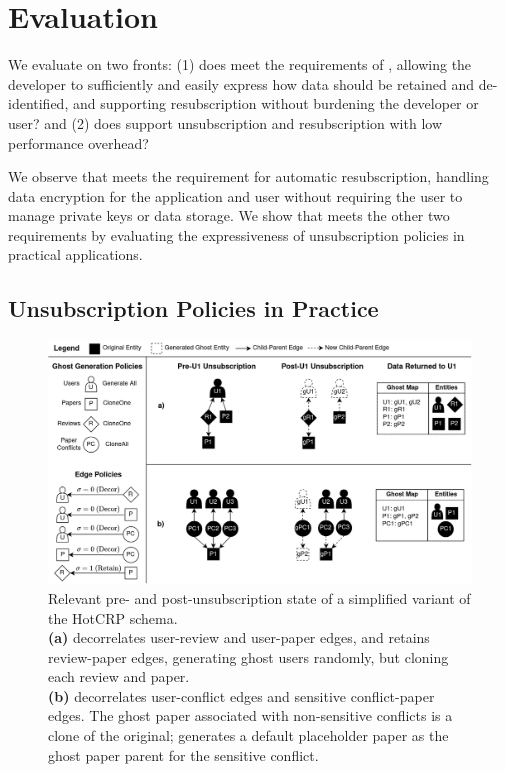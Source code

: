 \section{Evaluation}
We evaluate \sys on two fronts: (1) does \sys meet the requirements of \name,  
allowing the developer to sufficiently and easily express how data should be retained and
de-identified, and supporting resubscription without burdening the developer or user? and (2) 
does \sys support unsubscription and resubscription with low performance overhead?

We observe that \sys meets the requirement for automatic resubscription, handling
data encryption for the application and user without requiring the user to manage private keys or
data storage. We show that \sys meets the other two requirements by evaluating the
expressiveness of unsubscription policies in practical applications.

\subsection{Unsubscription Policies in Practice}
\label{sec:hotcrp_example}
\begin{figure}[t!]
    \centering
    \includegraphics[width=\textwidth]{img/decor_hotcrp}

    \caption{Relevant pre- and post-unsubscription state of a simplified variant of the HotCRP schema. \\ 
    \textbf{(a)} \sys decorrelates user-review and user-paper edges, and retains
    review-paper edges, generating ghost users randomly, but cloning each review and paper. \\
    \textbf{(b)} \sys decorrelates user-conflict edges and sensitive conflict-paper edges. The ghost
    paper associated with non-sensitive conflicts is a clone of the original; \sys generates a
    default placeholder paper as the ghost paper parent for the sensitive conflict.
    }
    \label{fig:hotcrp}
\end{figure}

